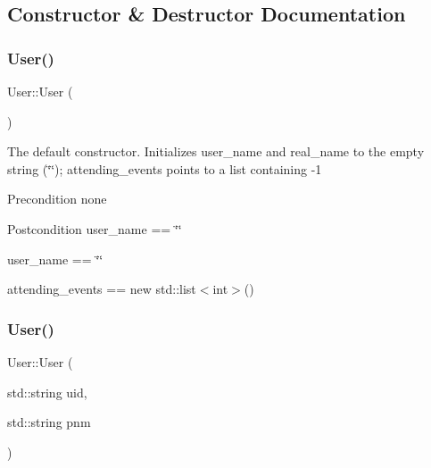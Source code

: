 \subsection{Constructor \& Destructor Documentation}
\mbox{\label{class_user_a4a0137053e591fbb79d9057dd7d2283d}} 
\subsubsection{\texorpdfstring{User()}{User()}\hspace{0.1cm}{\footnotesize\ttfamily [1/3]}}
{\footnotesize\ttfamily User\+::\+User (\begin{DoxyParamCaption}{ }\end{DoxyParamCaption})}

The default constructor. Initializes user\+\_\+name and real\+\_\+name to the empty string (\char`\"{}\char`\"{}); attending\+\_\+events points to a list containing -\/1 \begin{DoxyPrecond}{Precondition}
none 
\end{DoxyPrecond}
\begin{DoxyPostcond}{Postcondition}
user\+\_\+name == \char`\"{}\char`\"{} 

user\+\_\+name == \char`\"{}\char`\"{} 

attending\+\_\+events == new std\+::list$<$int$>$() 
\end{DoxyPostcond}
\mbox{\label{class_user_af7ad8135c0c766d006eadedf51e34013}} 
\subsubsection{\texorpdfstring{User()}{User()}\hspace{0.1cm}{\footnotesize\ttfamily [2/3]}}
{\footnotesize\ttfamily User\+::\+User (\begin{DoxyParamCaption}\item[{std\+::string}]{uid,  }\item[{std\+::string}]{pnm }\end{DoxyParamCaption})}

